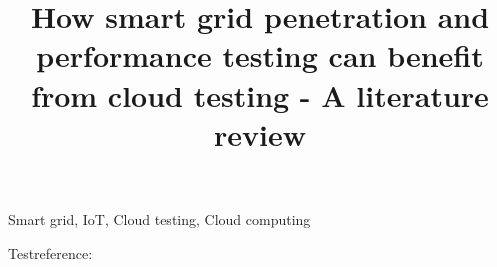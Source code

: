 \documentclass[conference]{biblio/IEEEtran}
\begin{document}
\title{How smart grid penetration and performance testing can benefit from cloud testing - A literature review\\}

\author{
}


\maketitle


\begin{IEEEkeywords}
Smart grid, IoT, Cloud testing, Cloud computing
\end{IEEEkeywords}








Testreference: \cite{electronics10091043}




\vspace{12pt}
\end{document}

